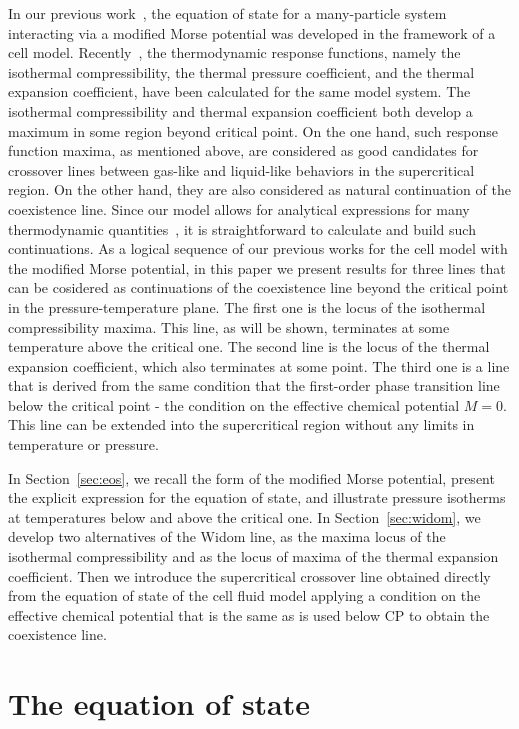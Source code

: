 In our previous work~\cite{KD20}, the equation of state for a many-particle system interacting via a modified Morse potential was developed in the framework of a cell model. Recently~\cite{DKRP24,DKRP24arxiv}, the thermodynamic response functions, namely the isothermal compressibility, the thermal pressure coefficient, and the thermal expansion coefficient, have been calculated for the same model system. The isothermal compressibility and thermal expansion coefficient both develop a maximum in some region beyond critical point. On the one hand, such response function maxima, as mentioned above, are considered as good candidates for crossover lines between gas-like and liquid-like behaviors in the supercritical region. On the other hand, they are also considered as natural continuation of the coexistence line. Since our model allows for analytical expressions for many thermodynamic quantities~\cite{KD20,DKRP24}, it is straightforward to calculate and build such continuations. As a logical sequence of our previous works for the cell model with the modified Morse potential, in this paper we present results for three lines that can be cosidered as continuations of the coexistence line beyond the critical point in the pressure-temperature plane. The first one is the locus of the isothermal compressibility maxima. This line, as will be shown, terminates at some temperature above the critical one. The second line is the locus of the thermal expansion coefficient, which also terminates at some point. The third one is a line that is derived from the same condition that the first-order phase transition line below the critical point - the condition on the effective chemical potential $M=0$. This line can be extended into the supercritical region without any limits in temperature or pressure.  

In Section~\ref{sec:eos}, we recall the form of the modified Morse potential, present the explicit expression for the equation of state, and illustrate pressure isotherms at temperatures below and above the critical one. In Section~\ref{sec:widom}, we develop two alternatives of the Widom line, as the maxima locus of the isothermal compressibility and as the locus of maxima of the thermal expansion coefficient. Then we introduce the supercritical crossover line obtained directly from the equation of state of the cell fluid model applying a condition on the effective chemical potential that is the same as is used below CP to obtain the coexistence line.


\section{\label{sec:eos} The equation of state}

